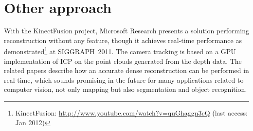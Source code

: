 \section{Other approach}

With the KinectFusion project, Microsoft Research presents a solution performing reconstruction without any feature, though it achieves real-time performance as demonstrated\footnote{KinectFusion: \url{http://www.youtube.com/watch?v=quGhaggn3cQ} (last access: Jan 2012)} at SIGGRAPH~2011. The camera tracking is based on a GPU implementation of \gls{ICP} on the point clouds generated from the depth data. The related papers \cite{Izadi_2011_SIGGRAPH} \cite{Newcombe_2011_ISMAR} describe how an accurate dense reconstruction can be performed in real-time, which sounds promising in the future for many applications related to computer vision, not only mapping but also segmentation and object recognition.
